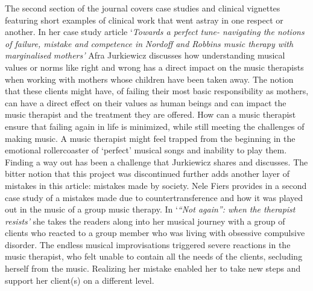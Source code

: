 \documentclass[authordate, empirical, issue]{jote-new-article}
\begin{document}
The second section of the journal covers case studies and clinical vignettes featuring short examples of clinical work that went astray in one respect or another. In her case study article ‘\emph{Towards a perfect tune- navigating the notions of failure, mistake and competence in }\emph{Nordoff}\emph{ and Robbins music therapy with }\emph{marginalised}\emph{ mothers' }Afra Jurkiewicz discusses how understanding musical values or norms like right and wrong has a direct impact on the music therapists when working with mothers whose children have been taken away. The notion that these clients might have, of failing their most basic responsibility as mothers, can have a direct effect on their values as human beings and can impact the music therapist and the treatment they are offered. How can a music therapist ensure that failing again in life is minimized, while still meeting the challenges of making music. A music therapist might feel trapped from the beginning in the emotional rollercoaster of ‘perfect' musical songs and inability to play them. Finding a way out has been a challenge that Jurkiewicz shares and discusses. The bitter notion that this project was discontinued further adds another layer of mistakes in this article: mistakes made by society. Nele Fiers provides in a second case study of a mistakes made due to countertransference and how it was played out in the music of a group music therapy. In ‘\emph{“Not again”: when the therapist resists'} she takes the readers along into her musical journey with a group of clients who reacted to a group member who was living with obsessive compulsive disorder. The endless musical improvisations triggered severe reactions in the music therapist, who felt unable to contain all the needs of the clients, secluding herself from the music. Realizing her mistake enabled her to take new steps and support her client(s) on a different level.
\end{document}
